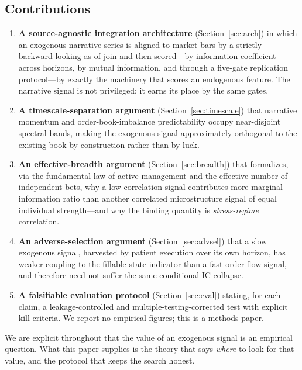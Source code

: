 \documentclass[11pt,a4paper]{article}
\theoremstyle{definition}
\theoremstyle{plain}
\begin{document}
\subsection{Contributions}

\begin{enumerate}
  \item \textbf{A source-agnostic integration architecture} (Section~\ref{sec:arch}) in which an
        exogenous narrative series is aligned to market bars by a strictly backward-looking as-of join
        and then scored---by information coefficient across horizons, by mutual information, and
        through a five-gate replication protocol---by exactly the machinery that scores an endogenous
        feature. The narrative signal is not privileged; it earns its place by the same gates.
  \item \textbf{A timescale-separation argument} (Section~\ref{sec:timescale}) that narrative momentum
        and order-book-imbalance predictability occupy near-disjoint spectral bands, making the
        exogenous signal approximately orthogonal to the existing book by construction rather than by
        luck.
  \item \textbf{An effective-breadth argument} (Section~\ref{sec:breadth}) that formalizes, via the
        fundamental law of active management and the effective number of independent bets, why a
        low-correlation signal contributes more marginal information ratio than another correlated
        microstructure signal of equal individual strength---and why the binding quantity is
        \emph{stress-regime} correlation.
  \item \textbf{An adverse-selection argument} (Section~\ref{sec:advsel}) that a slow exogenous signal,
        harvested by patient execution over its own horizon, has weaker coupling to the fillable-state
        indicator than a fast order-flow signal, and therefore need not suffer the same conditional-IC
        collapse.
  \item \textbf{A falsifiable evaluation protocol} (Section~\ref{sec:eval}) stating, for each claim, a
        leakage-controlled and multiple-testing-corrected test with explicit kill criteria. We report
        no empirical figures; this is a methods paper.
\end{enumerate}

We are explicit throughout that the value of an exogenous signal is an empirical question. What this
paper supplies is the theory that says \emph{where} to look for that value, and the protocol that
keeps the search honest.
\end{document}

